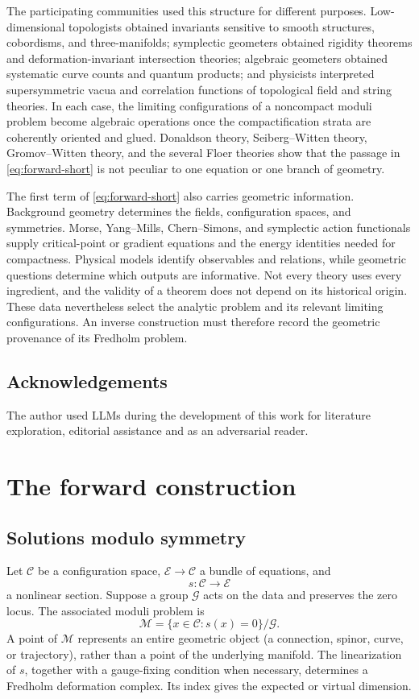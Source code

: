 \documentclass[11pt,letterpaper,twoside]{article}
\theoremstyle{plain}
\theoremstyle{definition}
\theoremstyle{remark}
\newcommand{\M}{\mathcal{M}}
\begin{document}
The participating communities used this structure for different purposes.  Low-dimensional topologists obtained invariants sensitive to smooth structures, cobordisms, and three-manifolds; symplectic geometers obtained rigidity theorems and deformation-invariant intersection theories; algebraic geometers obtained systematic curve counts and quantum products; and physicists interpreted supersymmetric vacua and correlation functions of topological field and string theories.  In each case, the limiting configurations of a noncompact moduli problem become algebraic operations once the compactification strata are coherently oriented and glued.  Donaldson theory, Seiberg--Witten theory, Gromov--Witten theory, and the several Floer theories show that the passage in \eqref{eq:forward-short} is not peculiar to one equation or one branch of geometry.

The first term of \eqref{eq:forward-short} also carries geometric information.  Background geometry determines the fields, configuration spaces, and symmetries.  Morse, Yang--Mills, Chern--Simons, and symplectic action functionals supply critical-point or gradient equations and the energy identities needed for compactness.  Physical models identify observables and relations, while geometric questions determine which outputs are informative.  Not every theory uses every ingredient, and the validity of a theorem does not depend on its historical origin.  These data nevertheless select the analytic problem and its relevant limiting configurations.  An inverse construction must therefore record the geometric provenance of its Fredholm problem.

\subsection*{Acknowledgements}
The author used LLMs during the development of this work for literature exploration, editorial assistance and as an adversarial reader.

\section{The forward construction}\label{sec:forward}

\subsection{Solutions modulo symmetry}

Let \(\mathcal C\) be a configuration space, \(\mathcal E\to\mathcal C\) a bundle of equations, and
\[
  s:\mathcal C\longrightarrow\mathcal E
\]
a nonlinear section.  Suppose a group \(\mathcal G\) acts on the data and preserves the zero locus.  The associated moduli problem is
\begin{equation}\label{eq:moduli-basic}
  \M=\{x\in\mathcal C:s(x)=0\}/\mathcal G.
\end{equation}
A point of \(\M\) represents an entire geometric object (a connection, spinor, curve, or trajectory), rather than a point of the underlying manifold.  The linearization of \(s\), together with a gauge-fixing condition when necessary, determines a Fredholm deformation complex.  Its index gives the expected or virtual dimension.
\end{document}
